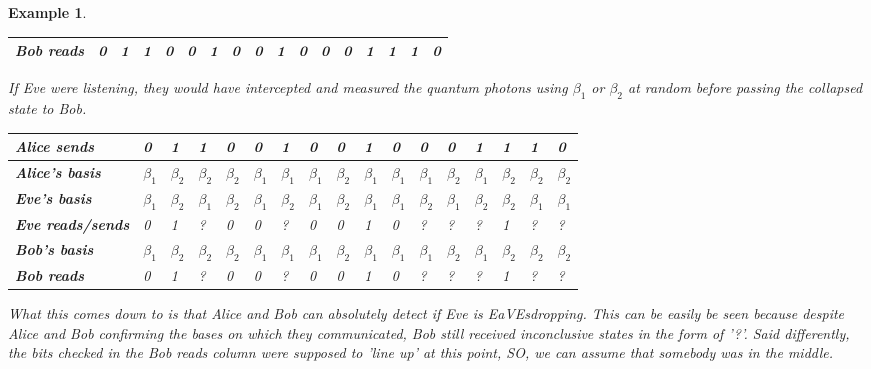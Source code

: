 \documentclass[12pt]{article}
\theoremstyle{plain}
\theoremstyle{nonumberplain}
\theoremstyle{plain}
\newtheorem{example}[lemma]{Example}
\theoremstyle{nonumberplain}
\newcommand\1{{\bf 1}}
\newcommand{\<}{\left\langle}
\renewcommand{\>}{\right\rangle}
\begin{document}
\begin{example}
\begin{center}
\begin{table}[h]
\begin{tabular}{|l|l|l|l|l|l|l|l|l|l|l|l|l|l|l|l|l|}
\textbf{Bob reads} & 0 & 1 & 1 & 0 & 0 & 1 & 0 & 0 & 1 & 0 & 0 & 0 & 1 & 1 & 1 & 0 \\ \hline
\end{tabular}
\end{table}
\end{center}
If Eve were listening, they would have intercepted and measured the quantum photons using $\beta_1$ or $\beta_2$ at random before passing the collapsed state to Bob.
\begin{center}
\begin{table}[h]
\centering
\begin{tabular}{|l|l|l|l|l|l|l|l|l|l|l|l|l|l|l|l|l|}
\hline
\textbf{Alice sends} & 0 & 1 & 1 & 0 & 0 & 1 & 0 & 0 & 1 & 0 & 0 & 0 & 1 & 1 & 1 & 0 \\ \hline
\textbf{Alice's basis} & $\beta_1$ & $\beta_2$ & $\beta_2$ & $\beta_2$ & $\beta_1$ & $\beta_1$ & $\beta_1$ & $\beta_2$ & $\beta_1$ & $\beta_1$ & $\beta_1$ & $\beta_2$ & $\beta_1$ & $\beta_2$ & $\beta_2$ & $\beta_2$ \\ \hline
\textbf{Eve's basis} & $\beta_1$ & $\beta_2$ & $\beta_1$ & $\beta_2$ & $\beta_1$ & $\beta_2$ & $\beta_1$ & $\beta_2$ & $\beta_1$ & $\beta_1$ & $\beta_2$ & $\beta_1$ & $\beta_2$ & $\beta_2$ & $\beta_1$ & $\beta_1$ \\ \hline
\textbf{Eve reads/sends} & 0 & 1 & ? & 0 & 0 & ? & 0 & 0 & 1 & 0 & ? & ? & ? & 1 & ? & ? \\ \hline
\textbf{Bob's basis} & $\beta_1$ & $\beta_2$ & $\beta_2$ & $\beta_2$ & $\beta_1$ & $\beta_1$ & $\beta_1$ & $\beta_2$ & $\beta_1$ & $\beta_1$ & $\beta_1$ & $\beta_2$ & $\beta_1$ & $\beta_2$ & $\beta_2$ & $\beta_2$ \\ \hline
\textbf{Bob reads} & 0 & 1 & ? & 0 & 0 & ? & 0 & 0 & 1 & 0 & ? & ? & ? & 1 & ? & ? \\ \hline
\end{tabular}
\end{table}
\end{center}
What this comes down to is that Alice and Bob \textit{can absolutely} detect if Eve is EaVEsdropping. This can be easily be seen because despite Alice and Bob confirming the bases on which they communicated, Bob still received inconclusive states in the form of '?'. Said differently, the bits checked in the \textit{Bob reads} column were supposed to 'line up' at this point, SO, we can assume that somebody was in the middle.
\end{example}

\end{document}
